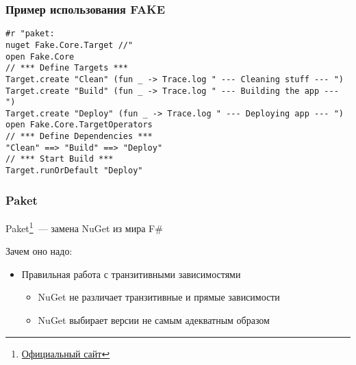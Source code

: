 \documentclass[aspectratio=169]{beamer}
\begin{document}
\begin{frame}[fragile]
    \frametitle{Пример использования FAKE}
    \begin{verbatim}
#r "paket:
nuget Fake.Core.Target //"
open Fake.Core
// *** Define Targets ***
Target.create "Clean" (fun _ -> Trace.log " --- Cleaning stuff --- ")
Target.create "Build" (fun _ -> Trace.log " --- Building the app --- ")
Target.create "Deploy" (fun _ -> Trace.log " --- Deploying app --- ")
open Fake.Core.TargetOperators
// *** Define Dependencies ***
"Clean" ==> "Build" ==> "Deploy"
// *** Start Build ***
Target.runOrDefault "Deploy"
    \end{verbatim}
\end{frame}

\begin{frame}
    \frametitle{Paket}
    Paket\footnote{\href{https://fsprojects.github.io/Paket/index.html}{Официальный сайт}}~--- замена NuGet из мира F\#

    Зачем оно надо:
    \begin{itemize}
        \item Правильная работа с транзитивными зависимостями
              \begin{itemize}
                  \item NuGet не различает транзитивные и прямые зависимости
                  \item NuGet выбирает версии не самым адекватным образом
              \end{itemize}
    \end{itemize}
\end{frame}
\end{document}
